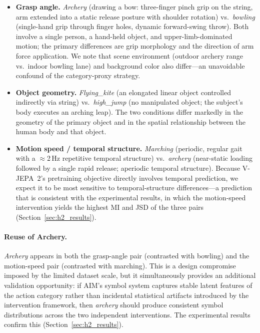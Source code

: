\documentclass{article}
\begin{document}
\begin{itemize}
  \item \textbf{Grasp angle.}
    \textit{Archery} (drawing a bow: three-finger pinch grip on the string,
    arm extended into a static release posture with shoulder rotation)
    vs.\ \textit{bowling} (single-hand grip through finger holes, dynamic
    forward-swing throw).
    Both involve a single person, a hand-held object, and upper-limb-dominated
    motion; the primary differences are grip morphology and the direction of
    arm force application.  We note that scene environment (outdoor archery
    range vs.\ indoor bowling lane) and background color also differ---an
    unavoidable confound of the category-proxy strategy.

  \item \textbf{Object geometry.}
    \textit{Flying\_kite} (an elongated linear object controlled indirectly via
    string) vs.\ \textit{high\_jump} (no manipulated object; the subject's body
    executes an arching leap).
    The two conditions differ markedly in the geometry of the primary object and
    in the spatial relationship between the human body and that object.

  \item \textbf{Motion speed / temporal structure.}
    \textit{Marching} (periodic, regular gait with a $\approx$2\,Hz repetitive
    temporal structure) vs.\ \textit{archery} (near-static loading followed by a
    single rapid release; aperiodic temporal structure).
    Because V-JEPA~2's pretraining objective directly involves temporal
    prediction, we expect it to be most sensitive to temporal-structure
    differences---a prediction that is consistent with the experimental results,
    in which the motion-speed intervention yields the highest MI and JSD of the
    three pairs (Section~\ref{sec:h2_results}).
\end{itemize}

\paragraph{Reuse of Archery.}
\textit{Archery} appears in both the grasp-angle pair (contrasted with bowling)
and the motion-speed pair (contrasted with marching).  This is a design
compromise imposed by the limited dataset scale, but it simultaneously provides
an additional validation opportunity: if AIM's symbol system captures stable
latent features of the action category rather than incidental statistical
artifacts introduced by the intervention framework, then \textit{archery} should
produce consistent symbol distributions across the two independent interventions.
The experimental results confirm this (Section~\ref{sec:h2_results}).
\end{document}
